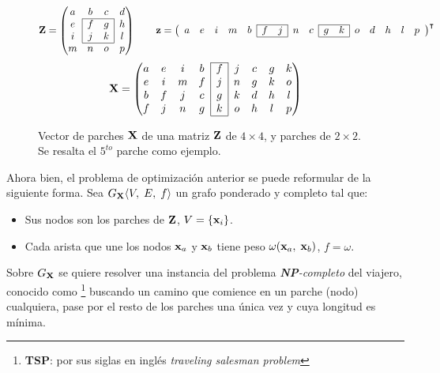 \begin{figure}[H]
	\[\Z = \left(
		\begin{matrix}
			a & b & c & d\\\cline{2-3}
			e & \multicolumn{1}{|c}{f} & \multicolumn{1}{c|}{g} & h\\
			i & \multicolumn{1}{|c}{j} & \multicolumn{1}{c|}{k} & l\\\cline{2-3}
			m & n & o & p\\
		\end{matrix}
	\right)
	\qquad\z = \left(
		\begin{array}{ccccc|cc|cc|cc|ccccc}
			\cline{6-7}\cline{10-11}
			a & e & i & m & b & f & j & n & c & g & k & o & d & h & l & p \\
			\cline{6-7}\cline{10-11}
		\end{array}
	\right)^\intercal\]
	\[\X = \left(
		\begin{matrix}\cline{5-5}
			a & e & i & b & \multicolumn{1}{|c|}{f} & j & c & g & k\\
			e & i & m & f & \multicolumn{1}{|c|}{j} & n & g & k & o\\
			b & f & j & c & \multicolumn{1}{|c|}{g} & k & d & h & l\\
			f & j & n & g & \multicolumn{1}{|c|}{k} & o & h & l & p\\\cline{5-5}
		\end{matrix}
	\right)\]
	\caption{Vector de parches $\mathbf{X}$ de una matriz $\mathbf{Z}$ de $4 \times 4$, y parches de $2 \times 2$. Se resalta el $5^{to}$ parche como ejemplo.}
	\label{ex:vector_X}
\end{figure}

Ahora bien, el problema de optimizaci\'on anterior se puede reformular de la siguiente forma. Sea $G_{\mathbf{X}} \langle V,\;E,\;f\rangle$ un grafo ponderado y completo \cite{west2001introduction} tal que:
\begin{itemize}
	\item Sus nodos son los parches de $\mathbf{Z}$, $V = \{\mathbf{x}_i\}$.
	\item Cada arista que une los nodos $\mathbf{x}_a$ y $\mathbf{x}_b$ tiene peso $\omega(\mathbf{x}_a,\; \mathbf{x}_b)$, $f = \omega$.
\end{itemize} 
Sobre $G_{\mathbf{X}}$ se quiere resolver una instancia del problema \textit{\textbf{NP}-completo} del viajero, conocido como \TSP\footnote{\textbf{TSP}: por sus siglas en ingl\'es \textit{traveling salesman problem}} \cite{cormen2009introduction,enwiki:tsp} buscando un camino que comience en un parche (nodo) cualquiera, pase por el resto de los parches una \'unica vez y cuya longitud es m\'inima.


